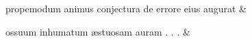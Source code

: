 \documentclass[12pt,onecolumn,twoside,a4paper]{memoir}
\begin{document}
\begin{pairs}
\begin{Leftside}
                              propemodum
                              animus
                              conjectura
                              de
                              errore
                              eius
                              augurat \&
                         \stanza {}
                     
                              ossuum
                              inhumatum
                              æstuosam
                              auram
                              .
                              .
                              . \&
                     
                  \endnumbering
		\end{Leftside}
                  \begin{Rightside}
			\beginnumbering
			\numberstanzafalse
                     

\end{Rightside}
\end{pairs}
\end{document}
